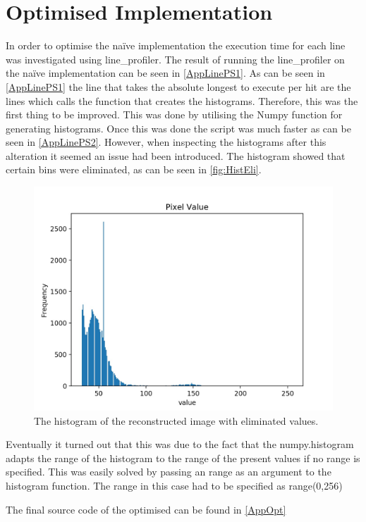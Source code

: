 \section{Optimised Implementation}
In order to optimise the na\"ive implementation the execution time for each line was investigated using line_profiler. The result of running the line_profiler on the na\"ive implementation can be seen in \autoref{AppLinePS1}. As can be seen in \autoref{AppLinePS1} the line that takes the absolute longest to execute per hit are the lines which calls the function that creates the histograms. Therefore, this was the first thing to be improved. This was done by utilising the Numpy function for generating histograms. Once this was done the script was much faster as can be seen in \autoref{AppLinePS2}. However, when inspecting the histograms after this alteration it seemed an issue had been introduced. The histogram showed that certain bins were eliminated, as can be seen in \autoref{fig:HistEli}. 
\begin{figure}[h]
\centering
\includegraphics[width=\textwidth]{figures/hist_troublespacing.jpg}
\caption{The histogram of the reconstructed image with eliminated values.}
\label{fig:HistEli}
\end{figure}
\noindent
Eventually it turned out that this was due to the fact that the numpy.histogram adapts the range of the histogram to the range of the present values if no range is specified. This was easily solved by passing an range as an argument to the histogram function. The range in this case had to be specified as range(0,256)

The final source code of the optimised can be found in \autoref{AppOpt}